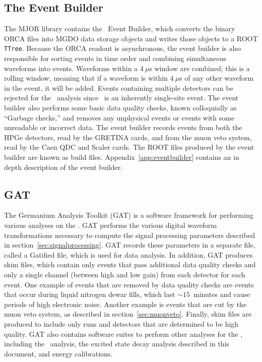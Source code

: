 \documentclass[/main.tex]{subfiles}
\begin{document}
\subsection{The Event Builder}
The MJOR library contains the \MJ\ Event Builder, which converts the binary ORCA files into MGDO data storage objects and writes those objects to a ROOT \texttt{TTree}.
Because the ORCA readout is asynchronous, the event builder is also responsible for sorting events in time order and combining simultaneous waveforms into events.
Waveforms within a $4~\mu$s window are combined; this is a rolling window, meaning that if a waveform is within $4~\mu$s of any other waveform in the event, it will be added.
Events containing multiple detectors can be rejected for the \znbb\ analysis since \znbb\ is an inherently single-site event.
The event builder also performs some basic data quality checks, known colloquially as ``Garbage checks,'' and removes any unphysical events or events with some unreadable or incorrect data.
The event builder records events from both the HPGe detectors, read by the GRETINA cards, and from the muon veto system, read by the Caen QDC and Scaler cards.
The ROOT files produced by the event builder are known as build files.
Appendix~\ref{app:eventbuilder} contains an in depth description of the event builder.
\\
\subsection{GAT}
The Germanium Analysis Toolkit (GAT) is a software framework for performing various analyses on the \MJD.
GAT performs the various digital waveform transformations necessary to compute the signal processing parameters described in section~\ref{sec:signalprocessing}.
GAT records these parameters in a separate file, called a Gatified file, which is used for data analysis.
In addition, GAT produces skim files, which contain only events that pass additional data quality checks and only a single channel (between high and low gain) from each detector for each event.
One example of events that are removed by data quality checks are events that occur during liquid nitrogen dewar fills, which last $\sim15$~minutes and cause periods of high electronic noise.
Another example is events that are cut by the muon veto system, as described in section~\ref{sec:muonveto}.
Finally, skim files are produced to include only runs and detectors that are determined to be high quality.
GAT also contains software suites to perform other analyses for the \MJD, including the \znbb\ analysis, the excited state decay analysis described in this document, and energy calibrations.
\\
\end{document}
